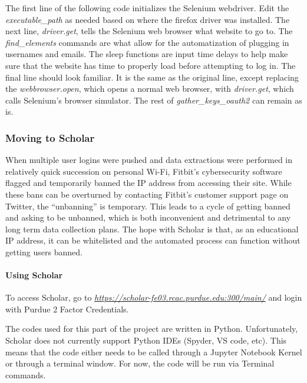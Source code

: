 \documentclass[]{book}
\let\oldparagraph\paragraph
\renewcommand{\paragraph}[1]{\oldparagraph{#1}\mbox{}}
\begin{document}
The first line of the following code initializes the Selenium webdriver. Edit the \emph{executable\_path} as needed based on where the firefox driver was installed. The next line, \emph{driver.get}, tells the Selenium web browser what website to go to. The \emph{find\_elements} commands are what allow for the automatization of plugging in usernames and emails. The sleep functions are input time delays to help make sure that the website has time to properly load before attempting to log in. The final line should look familiar. It is the same as the original line, except replacing the \emph{webbrowser.open}, which opens a normal web browser, with \emph{driver.get}, which calls Selenium's browser simulator. The rest of \emph{gather\_keys\_oauth2} can remain as is.

\hypertarget{moving-to-scholar}{%
\subsubsection{Moving to Scholar}\label{moving-to-scholar}}

When multiple user logins were pushed and data extractions were performed in relatively quick succession on personal Wi-Fi, Fitbit's cybersecurity software flagged and temporarily banned the IP address from accessing their site. While these bans can be overturned by contacting Fitbit's customer support page on Twitter, the ``unbanning'' is temporary. This leads to a cycle of getting banned and asking to be unbanned, which is both inconvenient and detrimental to any long term data collection plans. The hope with Scholar is that, as an educational IP address, it can be whitelisted and the automated process can function without getting users banned.

\hypertarget{using-scholar}{%
\paragraph{Using Scholar}\label{using-scholar}}

To access Scholar, go to \emph{\url{https://scholar-fe03.rcac.purdue.edu:300/main/}} and login with Purdue 2 Factor Credentials.

The codes used for this part of the project are written in Python. Unfortunately, Scholar does not currently support Python IDEs (Spyder, VS code, etc). This means that the code either needs to be called through a Jupyter Notebook Kernel or through a terminal window. For now, the code will be run via Terminal commands.
\end{document}
